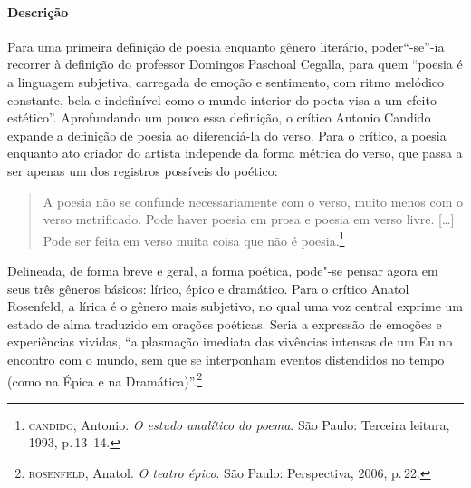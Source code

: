 \documentclass[11pt]{extarticle}
\begin{document}
\paragraph{Descrição} Para uma primeira definição de poesia enquanto gênero literário, poder“-se”-ia recorrer à definição do professor Domingos Paschoal Cegalla, para quem “poesia é a linguagem subjetiva, carregada de emoção e sentimento, com ritmo melódico constante, bela e indefinível como o mundo interior do poeta visa a um efeito estético”.
Aprofundando um pouco essa definição, o crítico Antonio Candido expande a definição de poesia ao diferenciá-la do verso. Para o crítico, a poesia enquanto ato criador do artista independe da forma métrica do verso, que passa a ser apenas um dos registros possíveis do poético:


\begin{quote}
A poesia não se confunde necessariamente com o verso, muito menos com o verso metrificado. Pode haver poesia em prosa e poesia em verso livre. [\ldots]
Pode ser feita em verso muita coisa que não é poesia.\footnote{\textsc{candido}, Antonio. \textit{O estudo analítico do poema}. São Paulo: Terceira leitura, 1993, p.\,13--14.}
\end{quote}

Delineada, de forma breve e geral, a forma poética, pode"-se pensar agora em seus três gêneros básicos: lírico, épico e dramático. Para o crítico Anatol Rosenfeld, a lírica é o gênero mais subjetivo, no qual uma voz central exprime um estado de alma traduzido em orações poéticas. Seria a expressão de emoções e experiências vividas, ``a plasmação imediata das vivências intensas de um Eu no encontro com o mundo, sem que se interponham eventos distendidos no tempo (como na Épica e na Dramática)''.\footnote{\textsc{rosenfeld}, Anatol. \textit{O teatro épico}. São Paulo: Perspectiva, 2006, p.\,22.}
\end{document}
